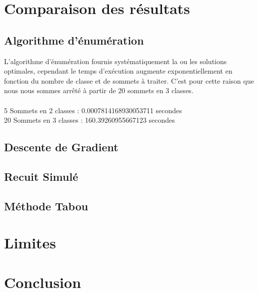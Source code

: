 \documentclass[a4paper]{article}
\begin{document}
\section{Comparaison des résultats}

\subsection{Algorithme d'énumération}
L'algorithme d'énumération fournis systématiquement la ou les solutions optimales, cependant le temps d’exécution augmente exponentiellement en fonction du nombre de classe et de sommets à traiter. C'est pour cette raison que nous nous sommes arrêté à partir de 20 sommets en 3 classes.\\\\
5 Sommets en 2 classes : 0.0007814168930053711 secondes\\
20 Sommets en 3 classes : 160.39260955667123 secondes

\subsection{Descente de Gradient}

\subsection{Recuit Simulé}

\subsection{Méthode Tabou}

\section{Limites}

\section{Conclusion}
\end{document}
